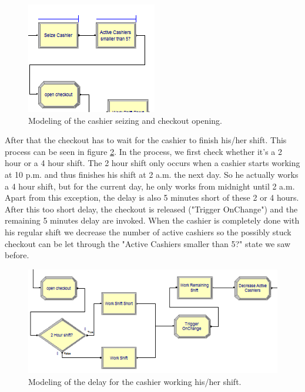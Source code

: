 \begin{figure}[h!]
	\includegraphics[scale=1]{images/model-description/seize-and-open.PNG}
	\caption{Modeling of the cashier seizing and checkout opening.}
	\label{fig:seizeandopen}
\end{figure}

After that the checkout has to wait for the cashier to finish his/her shift. This process can be seen in figure \ref{fig:workshift}. In the process, we first check whether it's a 2 hour or a 4 hour shift. The 2 hour shift only occurs when a cashier starts working at 10 p.m. and thus finishes his shift at 2 a.m. the next day. So he actually works a 4 hour shift, but for the current day, he only works from midnight until 2 a.m.
Apart from this exception, the delay is also 5 minutes short of these 2 or 4 hours. After this too short delay, the checkout is released ("Trigger OnChange") and the remaining 5 minutes delay are invoked.
When the cashier is completely done with his regular shift we decrease the number of active cashiers so the possibly stuck checkout can be let through the "Active Cashiers smaller than 5?" state we saw before.

\begin{figure}[]
	\includegraphics[scale=1]{images/model-description/work-shift.PNG}
	\caption{Modeling of the delay for the cashier working his/her shift.}
	\label{fig:workshift}
\end{figure}

